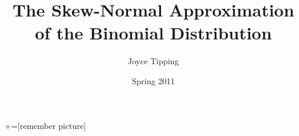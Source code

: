 \documentclass{beamer}
\begin{document}
\title[The Skew-Normal Approx of the Binomial]{The Skew-Normal Approximation\\of the Binomial Distribution}
\author{Joyce Tipping}
\date{Spring 2011}

+=[remember picture]

\everymath{\displaystyle}
\end{document}
